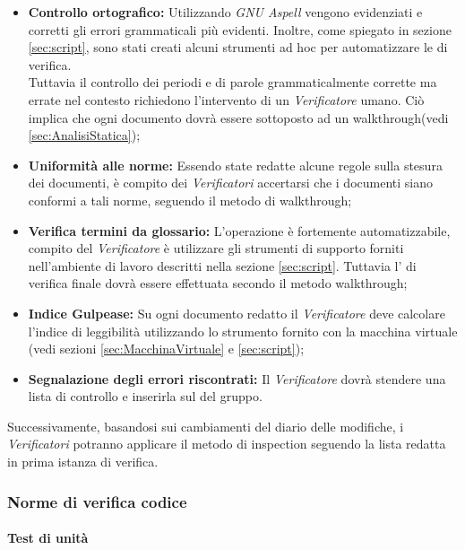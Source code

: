 \documentclass{scalatekids-article}
\begin{document}
\begin{itemize}
    \item\textbf{Controllo ortografico:} Utilizzando \textit{GNU Aspell} vengono evidenziati e corretti
        gli errori grammaticali più evidenti. Inoltre, come spiegato in sezione \ref{sec:script}, sono stati
        creati alcuni strumenti ad hoc per automatizzare le  di verifica.\\
        Tuttavia il controllo dei periodi e di parole grammaticalmente corrette ma errate nel contesto richiedono
        l'intervento di un \textit{Verificatore} umano. Ciò implica che ogni documento dovrà essere sottoposto ad un walkthrough(vedi \ref{sec:AnalisiStatica});
    \item\textbf{Uniformità alle norme:} Essendo state redatte alcune regole sulla stesura dei documenti, è compito dei \textit{Verificatori}
        accertarsi che i documenti siano conformi a tali norme, seguendo il metodo di walkthrough;
    \item\textbf{Verifica termini da glossario:} L'operazione è fortemente automatizzabile, compito del \textit{Verificatore} è utilizzare gli strumenti di supporto
        forniti nell'ambiente di lavoro descritti nella sezione \ref{sec:script}. Tuttavia l' di verifica finale dovrà essere effettuata secondo il metodo
        walkthrough;
    \item\textbf{Indice Gulpease:} Su ogni documento redatto il \textit{Verificatore} deve calcolare l'indice di leggibilità utilizzando lo strumento fornito
        con la macchina virtuale (vedi sezioni \ref{sec:MacchinaVirtuale} e \ref{sec:script});
    \item\textbf{Segnalazione degli errori riscontrati:} Il \textit{Verificatore} dovrà stendere una lista di controllo e inserirla sul  del gruppo.
\end{itemize}
Successivamente, basandosi sui cambiamenti del diario delle modifiche, i
\textit{Verificatori} potranno applicare il metodo di inspection seguendo la
lista redatta in prima istanza di verifica.

\subsubsection{Norme di verifica codice}

\paragraph{Test di unità}
\end{document}
